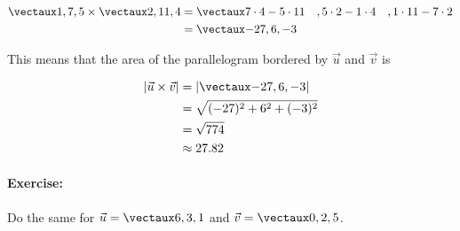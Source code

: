 \documentclass{article}
\begin{document}
\begin{align*}
\vect{1,7,5}\times\vect{2,11,4} &= \vect{7\cdot 4 - 5\cdot11\quad, 5\cdot2 - 1\cdot4\quad, 1\cdot11 - 7\cdot2}\\
&=\vect{-27, 6, -3 }
\end{align*}

This means that the area of the parallelogram bordered by $\vec{u}$ and $\vec{v}$ is 

\begin{align*}
|\vec{u}\times \vec{v}| &= |\vect{-27, 6,-3}|\\
&= \sqrt{(-27)^2+6^2+(-3)^2}\\
&=\sqrt{774}\\
&\approx 27.82
\end{align*}


\paragraph{Exercise:} Do the same for $\vec{u} = \vect{6,3,1}$ and $\vec{v} = \vect{0,2,5}$.


\end{document}
